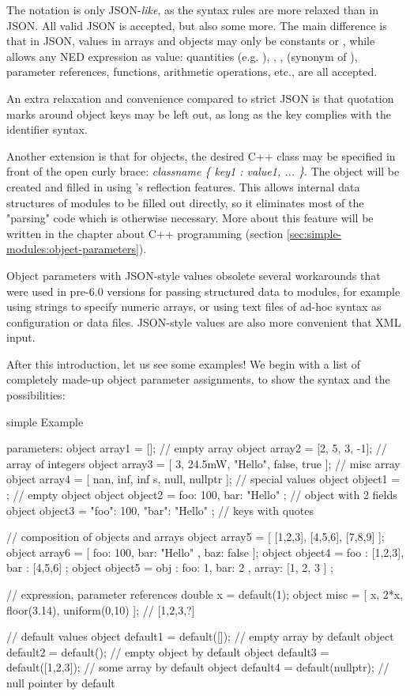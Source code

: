 The notation is only JSON-\textit{like}, as the syntax rules are more relaxed
than in JSON. All valid JSON is accepted, but also some more. The main difference
is that in JSON, values in arrays and objects may only be constants or ,
while {\opp} allows any NED expression as value: quantities (e.g. ),
, ,  (synonym of ),
parameter references, functions, arithmetic operations, etc., are all accepted.

An extra relaxation and convenience compared to strict JSON is that quotation
marks around object keys may be left out, as long as the key complies with
the identifier syntax.

Another extension is that for objects, the desired C++ class may be specified in
front of the open curly brace: \textit{classname \{ key1 : value1, ... \}}. The
object will be created and filled in using {\opp}'s reflection features. This
allows internal data structures of modules to be filled out directly, so it
eliminates most of the "parsing" code which is otherwise necessary. More about
this feature will be written in the chapter about C++ programming (section
\ref{sec:simple-modules:object-parameters}).

Object parameters with JSON-style values obsolete several workarounds that
were used in pre-6.0 {\opp} versions for passing structured data to modules,
for example using strings to specify numeric arrays, or using text files of
ad-hoc syntax as configuration or data files. JSON-style values are also more
convenient that XML input.

After this introduction, let us see some examples! We begin with
a list of completely made-up object parameter assignments, to show
the syntax and the possibilities:

\begin{ned}
simple Example {
    parameters:
        object array1 = []; // empty array
        object array2 = [2, 5, 3, -1]; // array of integers
        object array3 = [ 3, 24.5mW, "Hello", false, true ]; // misc array
        object array4 = [ nan, inf, inf s, null, nullptr ]; // special values
        object object1 = {};  // empty object
        object object2 = { foo: 100, bar: "Hello" }; // object with 2 fields
        object object3 = { "foo": 100, "bar": "Hello" }; // keys with quotes

        // composition of objects and arrays
        object array5 = [ [1,2,3], [4,5,6], [7,8,9] ];
        object array6 = [ { foo: 100, bar: "Hello" }, { baz: false } ];
        object object4 = { foo : [1,2,3], bar : [4,5,6] };
        object object5 = { obj : { foo: 1, bar: 2 }, array: [1, 2, 3 ] };

        // expression, parameter references
        double x = default(1);
        object misc = [ x, 2*x, floor(3.14), uniform(0,10) ]; // [1,2,3,?]

        // default values
        object default1 = default([]); // empty array by default
        object default2 = default({}); // empty object by default
        object default3 = default([1,2,3]); // some array by default
        object default4 = default(nullptr); // null pointer by default
}
\end{ned}

